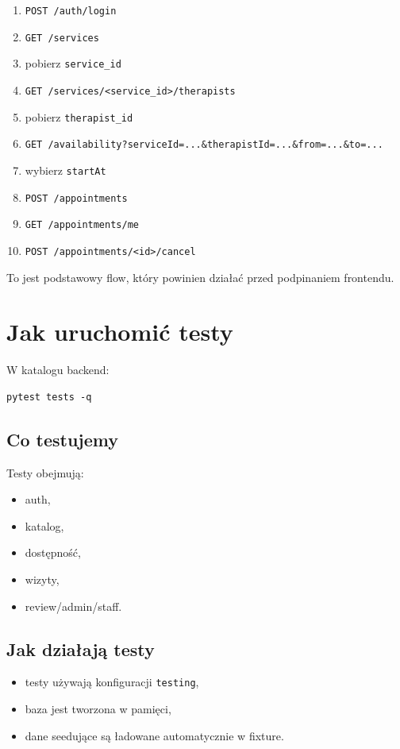 \documentclass[11pt,a4paper]{article}
\begin{document}
\begin{enumerate}[leftmargin=1.2cm]
    \item \texttt{POST /auth/login}
    \item \texttt{GET /services}
    \item pobierz \texttt{service\_id}
    \item \texttt{GET /services/<service\_id>/therapists}
    \item pobierz \texttt{therapist\_id}
    \item \texttt{GET /availability?serviceId=...\&therapistId=...\&from=...\&to=...}
    \item wybierz \texttt{startAt}
    \item \texttt{POST /appointments}
    \item \texttt{GET /appointments/me}
    \item \texttt{POST /appointments/<id>/cancel}
\end{enumerate}

To jest podstawowy flow, który powinien działać przed podpinaniem frontendu.

\section{Jak uruchomić testy}

W katalogu backend:

\begin{lstlisting}
pytest tests -q
\end{lstlisting}

\subsection{Co testujemy}
Testy obejmują:
\begin{itemize}[leftmargin=1.2cm]
    \item auth,
    \item katalog,
    \item dostępność,
    \item wizyty,
    \item review/admin/staff.
\end{itemize}

\subsection{Jak działają testy}
\begin{itemize}[leftmargin=1.2cm]
    \item testy używają konfiguracji \texttt{testing},
    \item baza jest tworzona w pamięci,
    \item dane seedujące są ładowane automatycznie w fixture.
\end{itemize}
\end{document}
